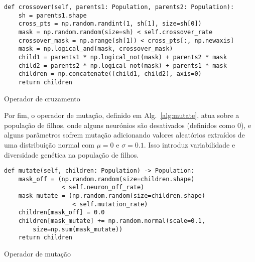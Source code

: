 \begin{listing}[!ht]
    \begin{verbatim}
def crossover(self, parents1: Population, parents2: Population):
    sh = parents1.shape
    cross_pts = np.random.randint(1, sh[1], size=sh[0])
    mask = np.random.random(size=sh) < self.crossover_rate
    crossover_mask = np.arange(sh[1]) < cross_pts[:, np.newaxis]
    mask = np.logical_and(mask, crossover_mask)
    child1 = parents1 * np.logical_not(mask) + parents2 * mask
    child2 = parents2 * np.logical_not(mask) + parents1 * mask
    children = np.concatenate((child1, child2), axis=0)
    return children
    \end{verbatim}
    \caption{Operador de cruzamento}
    \label{alg:crossover}
\end{listing}


Por fim, o operador de mutação, definido em Alg.~\ref{alg:mutate}, atua sobre a população de filhos, onde alguns neurónios são desativados (definidos como 0), e alguns parâmetros sofrem mutação adicionando valores aleatórios extraídos de uma distribuição normal com $\mu=0$ e $\sigma=0.1$.
Isso introduz variabilidade e diversidade genética na população de filhos.

\begin{listing}[!ht]
    \begin{verbatim}
def mutate(self, children: Population) -> Population:
    mask_off = (np.random.random(size=children.shape) 
                < self.neuron_off_rate)
    mask_mutate = (np.random.random(size=children.shape) 
                   < self.mutation_rate)
    children[mask_off] = 0.0
    children[mask_mutate] += np.random.normal(scale=0.1, 
        size=np.sum(mask_mutate))
    return children
    \end{verbatim}
    \caption{Operador de mutação}
    \label{alg:mutate}
\end{listing}
